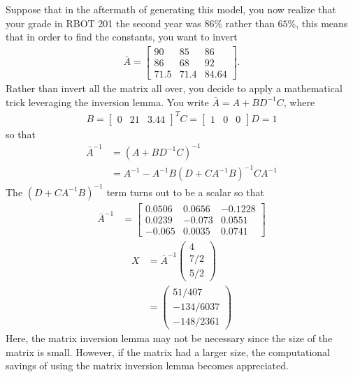 \begin{example}
	Suppose that in the aftermath of generating this model, you now realize that your grade in RBOT 201  the second year was $86\%$ rather than $65\%$, this means that in order to find the constants, you want to invert
	\begin{align}
	\bar{A} = \begin{bmatrix}
	90 & 85 & 86 \\
	86 & 68 & 92 \\
	71.5 & 71.4 & 84.64
	\end{bmatrix}.
	\end{align}
	Rather than invert all the matrix all over, you decide to apply a mathematical trick leveraging the inversion lemma. You write $\bar{A} = A + BD^{-1}C$, where 
	\begin{subequations}
		\begin{align}
			B = \begin{bmatrix}
					0 & 21 & 3.44
			\end{bmatrix}^T
			C = \begin{bmatrix}
			1 & 0 & 0
			\end{bmatrix}
			D = 1
		\end{align}
	\end{subequations}
so that 
%
\begin{align}
	\bar{A}^{-1} &= \left(A + BD^{-1}C\right)^{-1} \\
						&= A^{-1} - A^{-1} B\left(D + C A^{-1}B\right)^{-1} C A^{-1}
\end{align}
%
The $\left(D + C A^{-1}B\right)^{-1}$ term turns out to be a scalar so that 
%
\begin{align}
\bar{A}^{-1} &= \begin{bmatrix}
0.0506 & 0.0656 & -0.1228 \\
%
0.0239 & -0.073 & 0.0551 \\
%
-0.065 & 0.0035 & 0.0741
\end{bmatrix}
\end{align}
%
\begin{align}
	X &= \bar{A}^{-1} \left(\begin{array}{c}
	4 \\ 7/2 \\ 5/2
	\end{array}\right) \nonumber \\
	&= 
	\left(\begin{array}{c}
	51/407   \\
	-134/6037  \\
	-148/2361 
	\end{array}\right)
\end{align}
%
Here, the matrix inversion lemma may not be necessary since the size of the matrix is small. However, if the matrix had a larger size, the computational savings of using the matrix inversion lemma becomes appreciated.

\end{example}